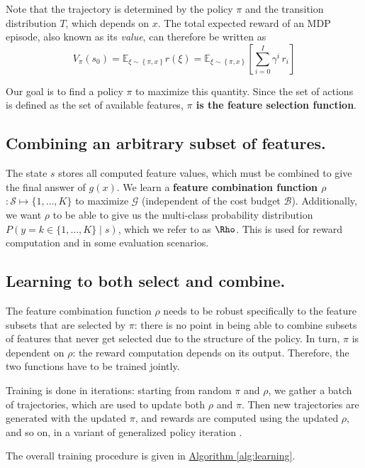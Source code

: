 Note that the trajectory is determined by the policy $\pi$ and the transition distribution $T$, which depends on $x$.
The total expected reward of an MDP episode, also known as its \emph{value}, can therefore be written as
\begin{equation} \label{eq:expected_reward}
V_\pi(s_0) = 
\mathbb{E}_{\xi \sim \left\{ \pi, x \right\}} r(\xi) =
\mathbb{E}_{\xi \sim \left\{ \pi, x \right\}} \left[ \sum_{i=0}^I \gamma^i \, r_i \right]
\end{equation}

Our goal is to find a policy $\pi$ to maximize this quantity.
Since the set of actions is defined as the set of available features, \textbf{$\pi$ is the feature selection function}.

\subsection{Combining an arbitrary subset of features.} 
The state $s$ stores all computed feature values, which must be combined to give the final answer of $g(x)$.
We learn a \textbf{feature combination function $\rho$} $: \mathcal{S} \mapsto \{1, \dots, K\}$ to maximize $\mathcal{G}$ (independent of the cost budget $\mathcal{B}$).
Additionally, we want $\rho$ to be able to give us the multi-class probability distribution $P(y = k \in \{1, \dots, K\} \mid s)$, which we refer to as $\Rho$.
This is used for reward computation and in some evaluation scenarios.

\subsection{Learning to both select and combine.}
The feature combination function $\rho$ needs to be robust specifically to the feature subsets that are selected by $\pi$: there is no point in being able to combine subsets of features that never get selected due to the structure of the policy.
In turn, $\pi$ is dependent on $\rho$: the reward computation depends on its output.
Therefore, the two functions have to be trained jointly.

Training is done in iterations: starting from random $\pi$ and $\rho$, we gather a batch of trajectories, which are used to update both $\rho$ and $\pi$.
Then new trajectories are generated with the updated $\pi$, and rewards are computed using the updated $\rho$, and so on, in a variant of generalized policy iteration \cite{Sutton1998}.

The overall training procedure is given in \hyperref[alg:learning]{Algorithm \ref*{alg:learning}}.

